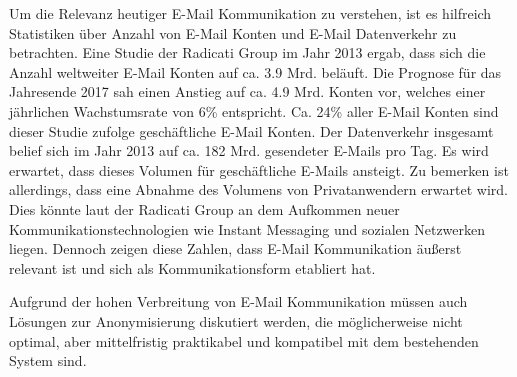 Um die Relevanz heutiger E-Mail Kommunikation zu verstehen, ist es hilfreich Statistiken über Anzahl von E-Mail Konten und E-Mail Datenverkehr zu betrachten. Eine Studie der Radicati Group 
im Jahr 2013 ergab, dass sich die Anzahl weltweiter E-Mail Konten auf ca. 3.9 Mrd. beläuft. Die Prognose für das Jahresende 2017 sah einen Anstieg auf ca. 4.9 Mrd. Konten vor, welches einer jährlichen Wachstumsrate von 6\% entspricht. Ca. 24\% aller E-Mail Konten sind dieser Studie zufolge geschäftliche E-Mail Konten.
Der Datenverkehr insgesamt belief sich im Jahr 2013 auf ca. 182 Mrd. gesendeter E-Mails pro Tag. Es wird erwartet, dass dieses Volumen für geschäftliche E-Mails ansteigt. Zu bemerken ist allerdings, dass eine Abnahme des Volumens von Privatanwendern erwartet wird. Dies könnte laut der Radicati Group
an dem Aufkommen neuer Kommunikationstechnologien wie Instant Messaging und sozialen Netzwerken liegen.
Dennoch zeigen diese Zahlen, dass E-Mail Kommunikation äußerst relevant ist und sich als Kommunikationsform etabliert hat. 

Aufgrund der hohen Verbreitung von E-Mail Kommunikation müssen auch Lösungen zur Anonymisierung diskutiert werden, die möglicherweise nicht optimal, aber mittelfristig praktikabel und kompatibel mit dem bestehenden System sind.
